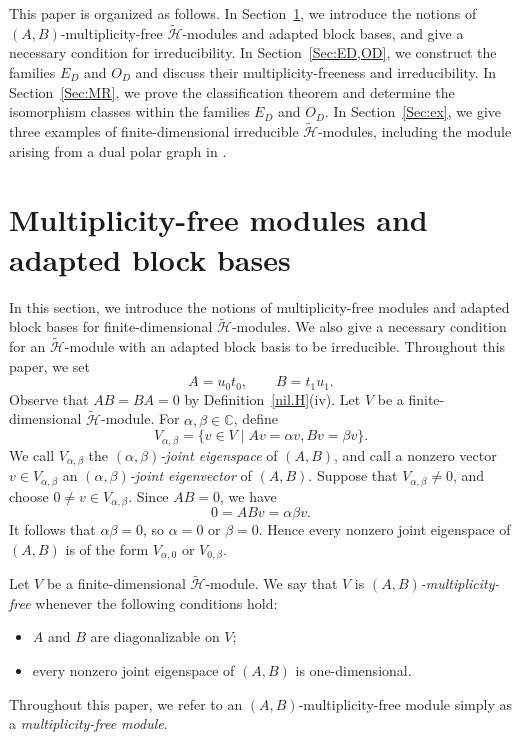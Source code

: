 \documentclass[reqno]{amsart}
\theoremstyle{definition}
\begin{document}
This paper is organized as follows.
In Section~\ref{Sec:MFABB}, we introduce the notions
of $(A,B)$-multiplicity-free $\widetilde{\mathcal{H}}$-modules
and adapted block bases, and give a necessary condition for irreducibility.
In Section~\ref{Sec:ED,OD}, we construct the families $E_D$ and $O_D$ and discuss their multiplicity-freeness and irreducibility.
In Section~\ref{Sec:MR}, we prove the classification theorem and determine the isomorphism classes within the families $E_D$ and $O_D$.
In Section~\ref{Sec:ex}, we give three examples of 
finite-dimensional irreducible $\widetilde{\mathcal{H}}$-modules, including the module arising from a dual
polar graph in \cite{LeeTanaka}.




\section{Multiplicity-free modules and adapted block bases}\label{Sec:MFABB}




In this section, we introduce the notions of multiplicity-free modules and adapted block bases for finite-dimensional $\widetilde{\mathcal{H}}$-modules. 
We also give a necessary condition for an $\widetilde{\mathcal{H}}$-module with an adapted block basis to be irreducible.
Throughout this paper, we set
\begin{equation}\label{eq:A,B}
A=u_0t_0,\qquad B=t_1u_1.
\end{equation}
Observe that $AB=BA=0$ by Definition~\ref{nil.H}(iv).
Let $V$ be a finite-dimensional $\widetilde{\mathcal{H}}$-module.
For $\alpha, \beta \in \mathbb{C}$, define
$$
V_{\alpha, \beta} = \{v \in V \mid Av = \alpha v, Bv = \beta v\}.
$$
We call $V_{\alpha,\beta}$ the \emph{$(\alpha,\beta)$-joint eigenspace}
of $(A,B)$, and call a nonzero vector $v\in V_{\alpha,\beta}$
an \emph{$(\alpha,\beta)$-joint eigenvector} of $(A,B)$.
Suppose that $V_{\alpha,\beta}\neq 0$, and choose
$0\neq v\in V_{\alpha,\beta}$.
Since $AB=0$, we have
$$
0=ABv=\alpha\beta v.
$$ 
It follows that $\alpha\beta=0$, so $\alpha=0$ or $\beta=0$.
Hence every nonzero joint eigenspace of $(A,B)$ is of the form
$V_{\alpha,0}$ or $V_{0,\beta}$.

Let $V$ be a finite-dimensional $\widetilde{\mathcal H}$-module.
We say that $V$ is {\it $(A,B)$-multiplicity-free} whenever the following conditions hold:
\begin{itemize}
\item[(i)] $A$ and $B$ are diagonalizable on $V$;
\item[(ii)] every nonzero joint eigenspace of $(A,B)$ is one-dimensional.
\end{itemize}
Throughout this paper, we refer to an $(A,B)$-multiplicity-free module simply as a {\it multiplicity-free module}.
\end{document}
